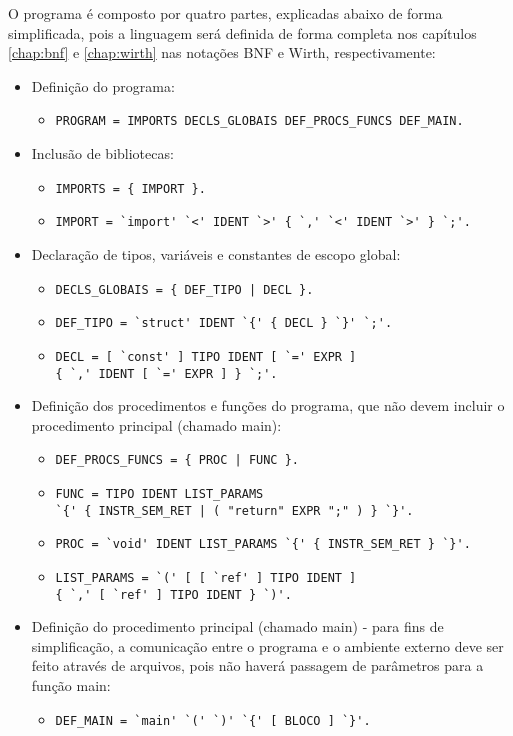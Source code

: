 
O programa é composto por quatro partes, explicadas abaixo de forma simplificada, pois a linguagem será definida de forma completa nos capítulos \ref{chap:bnf} e \ref{chap:wirth} nas notações BNF e Wirth, respectivamente:

\begin{itemize}
	\item Definição do programa:
		\begin{itemize}
			\item \verb$PROGRAM = IMPORTS DECLS_GLOBAIS DEF_PROCS_FUNCS DEF_MAIN.$
		\end{itemize}
	\item Inclusão de bibliotecas:
		\begin{itemize}
			\item \verb$IMPORTS = { IMPORT }.$
			\item \verb$IMPORT = `import' `<' IDENT `>' { `,' `<' IDENT `>' } `;'.$
		\end{itemize}
	\item Declaração de tipos, variáveis e constantes de escopo global:
		\begin{itemize}
			\item \verb$DECLS_GLOBAIS = { DEF_TIPO | DECL }.$
			\item \verb$DEF_TIPO = `struct' IDENT `{' { DECL } `}' `;'.$
			\item \verb$DECL = [ `const' ] TIPO IDENT [ `=' EXPR ]$\\
				\verb${ `,' IDENT [ `=' EXPR ] } `;'.$
		\end{itemize}
	\item Definição dos procedimentos e funções do programa, que não devem incluir o procedimento principal (chamado main):
		\begin{itemize}
			\item \verb$DEF_PROCS_FUNCS = { PROC | FUNC }.$
			\item \verb$FUNC = TIPO IDENT LIST_PARAMS$\\
				\verb$`{' { INSTR_SEM_RET | ( "return" EXPR ";" ) } `}'.$
			\item \verb$PROC = `void' IDENT LIST_PARAMS `{' { INSTR_SEM_RET } `}'.$
			\item \verb$LIST_PARAMS = `(' [ [ `ref' ] TIPO IDENT ]$\\
				\verb${ `,' [ `ref' ] TIPO IDENT } `)'.$
		\end{itemize}
	\item Definição do procedimento principal (chamado main) - para fins de simplificação, a comunicação entre o programa e o ambiente externo deve ser feito através de arquivos, pois não haverá passagem de parâmetros para a função main:
		\begin{itemize}
			\item \verb$DEF_MAIN = `main' `(' `)' `{' [ BLOCO ] `}'.$
		\end{itemize}
\end{itemize}
